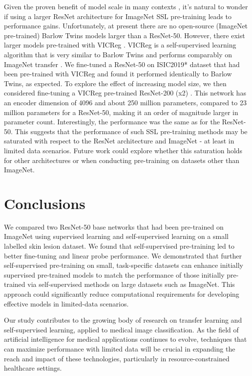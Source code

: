\documentclass[a4paper,fleqn]{cas-dc}
\begin{document}
Given the proven benefit of model scale in many contexts \cite{kaplan2020scalinglawsneurallanguage,dosovitskiy2020image}, it's natural to wonder if using a larger ResNet architecture for ImageNet SSL pre-training leads to performance gains. Unfortunately, at present there are no open-source (ImageNet pre-trained) Barlow Twins models larger than a ResNet-50. However, there exist larger models pre-trained with VICReg \cite{vicreg}. VICReg is a self-supervised learning algorithm that is very similar to Barlow Twins and performs comparably on ImageNet transfer \cite{vicreg}. We fine-tuned a ResNet-50 on  ISIC2019* dataset that had been pre-trained with VICReg and found it performed identically to Barlow Twins, as expected. To explore the effect of increasing model size, we then considered fine-tuning a VICReg pre-trained ResNet-200 (x2) \cite{vicreg}. This network has an encoder dimension of 4096 and about 250 million parameters, compared to 23 million parameters for a ResNet-50, making it an order of magnitude larger in parameter count. Interestingly, the performance was the same as for the ResNet-50. This suggests that the performance of such SSL pre-training methods may be saturated with respect to the ResNet architecture and ImageNet - at least in limited data scenarios. Future work could explore whether this saturation holds for other architectures or when conducting pre-training on datasets other than ImageNet.

\section{Conclusions}
We compared two ResNet-50 base networks that had been pre-trained on ImageNet using supervised learning and self-supervised learning on a small labelled skin lesion dataset. We found that self-supervised pre-training led to better fine-tuning and linear probe performance. We demonstrated that further self-supervised pre-training on small, task-specific datasets can enhance initially supervised pre-trained models to match the performance of those initially pre-trained via self-supervised methods on large datasets such as ImageNet.  This approach could significantly reduce
computational requirements for developing effective models in limited-data scenarios.

Our study contributes to the growing body of research on transfer learning and self-supervised learning, applied
to medical image classification. As the field of artificial intelligence for medical applications continues to evolve, techniques that can maximize performance with limited data will be crucial in expanding the reach and impact of these technologies, particularly in resource-constrained healthcare settings.
 
\end{document}
